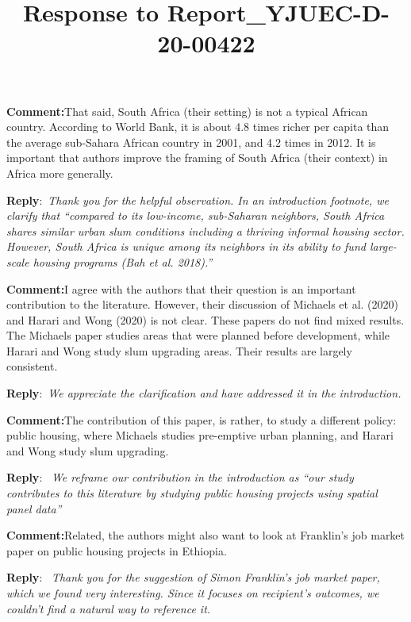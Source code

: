 \documentclass{article}
\title{Response to Report\_YJUEC-D-20-00422}
\author{}
\newcommand{\reply}{\medskip \noindent \textbf{Reply}:\ \textit }
\newcommand{\sr}{\begin{minipage}{\dimexpr\textwidth-3cm}}
\newcommand{\er}{\end{minipage}}
\newcommand{\cc}{\medskip \noindent \textbf{Comment:}\hspace{2em}}
\begin{document}
\maketitle

\noindent

\cc That said, South Africa (their setting) is not a typical African country.  According to World Bank, it is about 4.8 times richer per capita than the average sub-Sahara African country in 2001, and 4.2 times in 2012. It is important that authors improve the framing of South Africa (their context) in Africa more generally.

\sr
\reply{Thank you for the helpful observation.  In an introduction footnote, we clarify that ``compared to its low-income, sub-Saharan neighbors, South Africa shares similar urban slum conditions including a thriving informal housing sector.  However, South Africa is unique among its neighbors in its ability to fund large-scale housing programs (Bah et al. 2018).'' }\\
\er

\cc I agree with the authors that their question is an important contribution to the literature. However, their discussion of Michaels et al. (2020) and Harari and Wong (2020) is not clear. These papers do not find mixed results. The Michaels paper studies areas that were planned before development, while Harari and Wong study slum upgrading areas. Their results are largely consistent. 

\sr
\reply{We appreciate the clarification and have addressed it in the introduction.}\\
\er

\cc The contribution of this paper, is rather, to study a different policy: public housing, where Michaels studies pre-emptive urban planning, and Harari and Wong study slum upgrading. 

\sr
\reply{ We reframe our contribution in the introduction as ``our study contributes to this literature by studying public housing projects using spatial panel data''}\\
\er

\cc Related, the authors might also want to look at Franklin's job market paper on public housing projects in Ethiopia.

\sr
\reply{ Thank you for the suggestion of Simon Franklin's job market paper, which we found very interesting.  Since it focuses on recipient's outcomes, we couldn't find a natural way to reference it.}\\
\er
\end{document}
